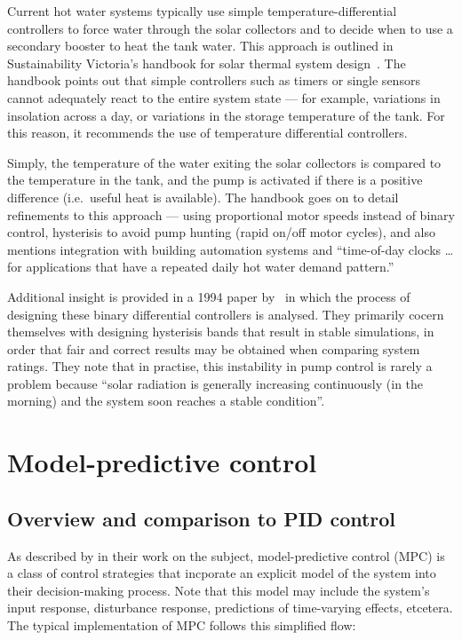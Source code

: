 Current hot water systems typically use simple temperature-differential controllers to force water through the solar collectors and to decide when to use a secondary booster to heat the tank water.
This approach is outlined in Sustainability Victoria's handbook for solar thermal system design~\cite{LSTS}.
The handbook points out that simple controllers such as timers or single sensors cannot adequately react to the entire system state --- for example, variations in insolation across a day, or variations in the storage temperature of the tank.
For this reason, it recommends the use of temperature differential controllers.

Simply, the temperature of the water exiting the solar collectors is compared to the temperature in the tank, and the pump is activated if there is a positive difference (i.e.\ useful heat is available).
The handbook goes on to detail refinements to this approach --- using proportional motor speeds instead of binary control, hysterisis to avoid pump hunting (rapid on/off motor cycles), and also mentions integration with building automation systems and ``time-of-day clocks \ldots for applications that have a repeated daily hot water demand pattern.''

Additional insight is provided in a 1994 paper by~\textcite{Beckman94} in which the process of designing these binary differential controllers is analysed.
They primarily cocern themselves with designing hysterisis bands that result in stable simulations, in order that fair and correct results may be obtained when comparing system ratings.
They note that in practise, this instability in pump control is rarely a problem because ``solar radiation is generally increasing continuously (in the morning) and the system soon reaches a stable condition''.

\section{Model-predictive control}

\subsection{Overview and comparison to PID control}

As described by \textcite{Camacho04} in their work on the subject, model-predictive control (MPC) is a class of control strategies that incporate an explicit model of the system into their decision-making process.
Note that this model may include the system's input response, disturbance response, predictions of time-varying effects, etcetera.
The typical implementation of MPC follows this simplified flow:

